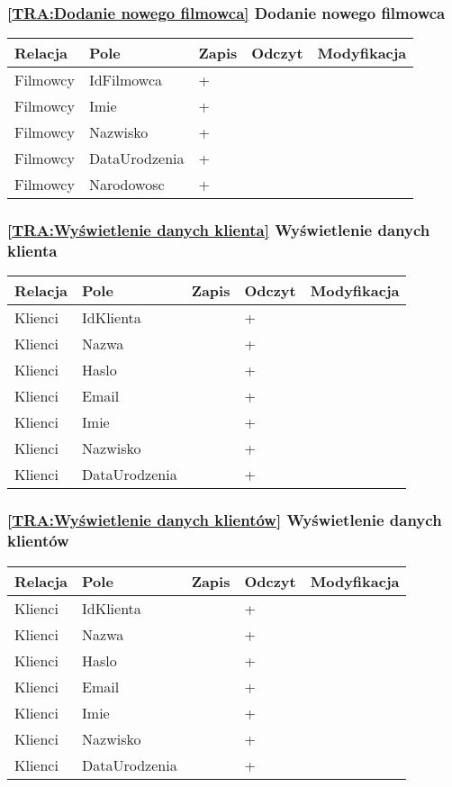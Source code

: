 \subsubsection*{\ref{TRA:Dodanie nowego filmowca} Dodanie nowego filmowca}
\begin{tabularx}{\textwidth}{|Y|Y|Y|Y|Y|}\hline
Relacja & Pole & Zapis & Odczyt & Modyfikacja \\\hline
Filmowcy & IdFilmowca & + &  & \\
Filmowcy & Imie & + &  & \\
Filmowcy & Nazwisko & + &  & \\
Filmowcy & DataUrodzenia & + &  & \\
Filmowcy & Narodowosc & + &  & \\
\hline\end{tabularx}
\subsubsection*{\ref{TRA:Wyświetlenie danych klienta} Wyświetlenie danych klienta}
\begin{tabularx}{\textwidth}{|Y|Y|Y|Y|Y|}\hline
Relacja & Pole & Zapis & Odczyt & Modyfikacja \\\hline
Klienci & IdKlienta &  & + & \\
Klienci & Nazwa &  & + & \\
Klienci & Haslo &  & + & \\
Klienci & Email &  & + & \\
Klienci & Imie &  & + & \\
Klienci & Nazwisko &  & + & \\
Klienci & DataUrodzenia &  & + & \\
\hline\end{tabularx}
\subsubsection*{\ref{TRA:Wyświetlenie danych klientów} Wyświetlenie danych klientów}
\begin{tabularx}{\textwidth}{|Y|Y|Y|Y|Y|}\hline
Relacja & Pole & Zapis & Odczyt & Modyfikacja \\\hline
Klienci & IdKlienta &  & + & \\
Klienci & Nazwa &  & + & \\
Klienci & Haslo &  & + & \\
Klienci & Email &  & + & \\
Klienci & Imie &  & + & \\
Klienci & Nazwisko &  & + & \\
Klienci & DataUrodzenia &  & + & \\
\hline\end{tabularx}

